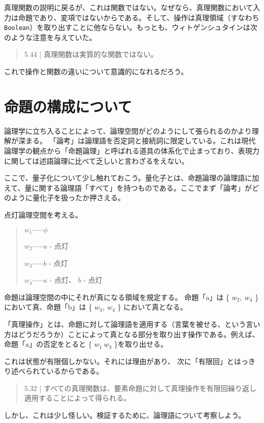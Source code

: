 \documentclass[a4paper,onecolumn,article]{jarticle}
\newcounter{ct}               %
\begin{document}
真理関数の説明に戻るが、これは関数ではない。なぜなら、真理関数において入力は命題であり、変項ではないからである。そして、操作は真理領域（すなわち\texttt{Boolean}）を取り出すことに他ならない。もっとも、ウィトゲンシュタインは次のような注意を与えていた。

\begin{quote}
  5.44 | 真理関数は実質的な関数ではない。
\end{quote}

これで操作と関数の違いについて意識的になれるだろう。

\section{命題の構成について}

論理学に立ち入ることによって、論理空間がどのようにして張られるのかより理解が深まる。
「論考」は論理語を否定詞と接続詞に限定している。これは現代論理学の観点から「命題論理」と呼ばれる道具の体系化で止まっており、表現力に関しては述語論理に比べて乏しいと言わざるをえない。

ここで、量子化について少し触れておこう。量化子とは、命題論理の論理語に加えて、量に関する論理語「すべて」を持つものである。ここでまず「論考」がどのように量化子を扱ったか押さえる。

点灯論理空間を考える。
\begin{quote}
  $w_1 \cdots \cdots \phi$
  
  $w_2 \cdots \cdots a$ - 点灯
  
  $w_3 \cdots \cdots b$ - 点灯
  
  $w_4 \cdots \cdots a$ - 点灯、 $b$ - 点灯
\end{quote}

命題は論理空間の中にそれが真になる領域を規定する。
命題「a」は \{ $w_2, \  w_4$ \}において真、命題「b」は \{ $w_3, \ w_4$ \} において真となる。

「真理操作」とは、命題に対して論理語を適用する（言葉を被せる、という言い方はどうだろうか）ことによって真となる部分を取り出す操作である。例えば、命題「a」の否定をとると \{ $w_1 \ w_3$ \}を取り出せる。

これは状態が有限個しかない。それには理由があり、 次に「有限回」とはっきり述べられているからである。

\begin{quote}
  5.32 | すべての真理関数は、要素命題に対して真理操作を有限回繰り返し適用することによって得られる。
\end{quote}

しかし、これは少し怪しい。検証するために、論理語について考察しよう。
\end{document}
